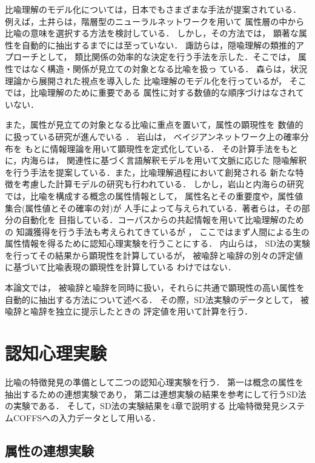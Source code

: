 比喩理解のモデル化については，日本でもさまざまな手法が提案されている．
例えば，土井ら\cite{Doi1989}は，階層型のニューラルネットワークを用いて
属性層の中から比喩の意味を選択する方法を検討している．
しかし，その方法では，
顕著な属性を自動的に抽出するまでには至っていない．
諏訪ら\cite{SuwaAndMotoda1994}は，隠喩理解の類推的アプローチとして，
類比関係の効率的な決定を行う手法を示した．そこでは，
属性ではなく構造・関係が見立ての対象となる比喩を扱っ
ている．
森ら\cite{MoriAndNakagawa1991}は，状況理論から展開された視点を導入した
比喩理解のモデル化を行っているが，
そこでは，比喩理解のために重要である
属性に対する数値的な順序づけはなされていない．

また，属性が見立ての対象となる比喩に重点を置いて，属性の顕現性を
数値的に扱っている研究が進んでいる
\cite{Iwayama1992,UtsumiAndSugeno1996,UchiyamaAndItabashi1996}．
岩山\cite{Iwayama1992}は，
ベイジアンネットワーク上の確率分布を
もとに情報理論を用いて顕現性を定式化している．
その計算手法をもとに，内海ら\cite{UtsumiAndSugeno1996}は，
関連性に基づく言語解釈モデルを用いて文脈に応じた
隠喩解釈を行う手法を提案している．また，比喩理解過程において創発される
新たな特徴を考慮した計算モデルの研究も行われている\cite{Utsumi1997}．
しかし，岩山と内海らの研究では，比喩を構成する概念の属性情報として，
属性名とその重要度や，属性値集合(属性値とその確率の対)が
人手によって与えられている．著者らは，その部分の自動化を
目指している．コーパスからの共起情報を用いて比喩理解のための
知識獲得を行う手法も考えられてきているが
\cite{MasuiAndSugioAndTazoeAndShiino1997}，
ここではまず人間による生の属性情報を得るために認知心理実験を行うことにする．
内山ら\cite{UchiyamaAndItabashi1996}は，
SD法の実験を行ってその結果から顕現性を計算しているが，
被喩辞と喩辞の別々の評定値に基づいて比喩表現の顕現性を計算している
わけではない．

本論文では，
被喩辞と喩辞を同時に扱い，それらに共通で顕現性の高い属性を
自動的に抽出する方法について述べる．
その際，SD法実験のデータとして，
被喩辞と喩辞を独立に提示したときの
評定値を用いて計算を行う．


\section{認知心理実験}

比喩の特徴発見の準備として二つの認知心理実験を行う．
第一は概念の属性を抽出するための連想実験であり，
第二は連想実験の結果を参考にして行うSD法の実験である．
そして，SD法の実験結果を4章で説明する
比喩特徴発見システムCOFFSへの入力データとして用いる．

\subsection{属性の連想実験}


